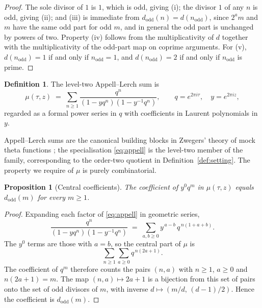 \documentclass[11pt,a4paper]{article}
\newcommand{\dodd}{d_{\mathrm{odd}}}
\theoremstyle{plain}
\newtheorem{proposition}[theorem]{Proposition}
\theoremstyle{definition}
\newtheorem{definition}[theorem]{Definition}
\theoremstyle{remark}
\begin{document}
\begin{proof}
The sole divisor of $1$ is $1$, which is odd, giving (i); the divisor $1$ of any $n$ is odd, giving (ii); and (iii) is immediate from $\dodd(n) = d(n_{\mathrm{odd}})$, since $2^a m$ and $m$ have the same odd part for odd $m$, and in general the odd part is unchanged by powers of two. Property (iv) follows from the multiplicativity of $d$ together with the multiplicativity of the odd-part map on coprime arguments. For (v), $d(n_{\mathrm{odd}}) = 1$ if and only if $n_{\mathrm{odd}} = 1$, and $d(n_{\mathrm{odd}}) = 2$ if and only if $n_{\mathrm{odd}}$ is prime.
\end{proof}

\begin{definition}\label{def:appell}
The level-two Appell--Lerch sum is
\begin{equation}\label{eq:appell}
  \mu(\tau,z) \;=\; \sum_{n \ge 1} \frac{q^n}{(1 - yq^n)(1 - y^{-1}q^n)},
  \qquad q = e^{2\pi i\tau},\quad y = e^{2\pi i z},
\end{equation}
regarded as a formal power series in $q$ with coefficients in Laurent polynomials in $y$.
\end{definition}

Appell--Lerch sums are the canonical building blocks in Zwegers' theory of mock theta functions \cite{Zwegers}; the specialisation \eqref{eq:appell} is the level-two member of the family, corresponding to the order-two quotient in Definition~\ref{def:setting}. The property we require of $\mu$ is purely combinatorial.

\begin{proposition}[Central coefficients]\label{prop:appell}
The coefficient of $y^0 q^m$ in $\mu(\tau,z)$ equals $\dodd(m)$ for every $m \ge 1$.
\end{proposition}

\begin{proof}
Expanding each factor of \eqref{eq:appell} in geometric series,
\[
\frac{q^n}{(1 - yq^n)(1 - y^{-1}q^n)} \;=\; \sum_{a,b \ge 0} y^{\,a-b}\, q^{\,n(1+a+b)} .
\]
The $y^0$ terms are those with $a = b$, so the central part of $\mu$ is
\[
\sum_{n \ge 1} \sum_{a \ge 0} q^{\,n(2a+1)} .
\]
The coefficient of $q^m$ therefore counts the pairs $(n,a)$ with $n \ge 1$, $a \ge 0$ and $n(2a+1) = m$. The map $(n,a) \mapsto 2a+1$ is a bijection from this set of pairs onto the set of odd divisors of $m$, with inverse $d \mapsto (m/d,\, (d-1)/2)$. Hence the coefficient is $\dodd(m)$.
\end{proof}
\end{document}
